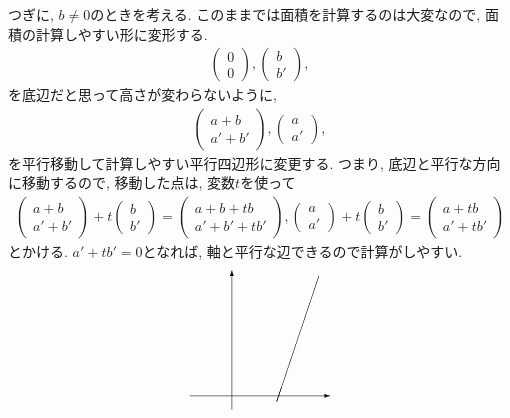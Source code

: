 \begin{remark}
  つぎに, $b\neq 0$のときを考える.
  このままでは面積を計算するのは大変なので,
  面積の計算しやすい形に変形する.
  \begin{align*}
    \begin{pmatrix}
      0\\0
    \end{pmatrix},
    \begin{pmatrix}
      b\\b'
    \end{pmatrix},
  \end{align*}
  を底辺だと思って高さが変わらないように,
  \begin{align*}
  \begin{pmatrix}
    a+b\\a'+b'
  \end{pmatrix},
  \begin{pmatrix}
    a\\a'
  \end{pmatrix},
  \end{align*}
  を平行移動して計算しやすい平行四辺形に変更する.
  つまり, 底辺と平行な方向に移動するので,
  移動した点は,   変数$t$を使って
  \begin{align*}
  \begin{pmatrix}
    a+b\\a'+b'
  \end{pmatrix}+t\begin{pmatrix}
      b\\b'
    \end{pmatrix}=\begin{pmatrix}
    a+b+tb\\a'+b'+tb'
    \end{pmatrix},
  \begin{pmatrix}
    a\\a'
  \end{pmatrix}+t\begin{pmatrix}
      b\\b'
  \end{pmatrix}
  =
  \begin{pmatrix}
    a+tb\\a'+tb'
  \end{pmatrix}
  \end{align*}
  とかける.
  $a'+tb'=0$となれば, 軸と平行な辺できるので計算がしやすい.
  \begin{align*}
    \begin{picture}(100,100)
      \put(30,0){\vector(0,1){100}}
      \put(0,10){\vector(1,0){100}}
      \put(92,96){\line(-1,-3){30}}

\end{picture}
\end{align*}
\end{remark}
